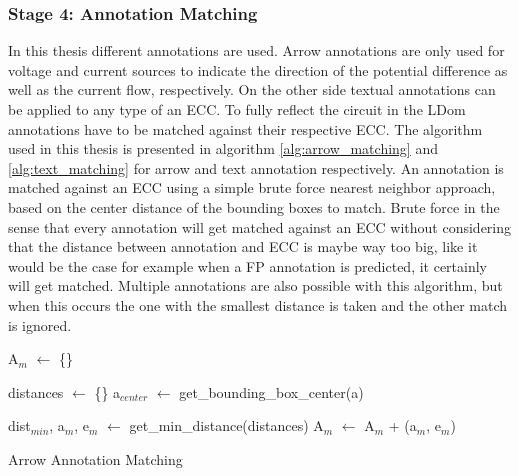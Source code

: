 \subsubsection{Stage 4: Annotation Matching}

In this thesis different annotations are used.
Arrow annotations are only used for voltage and current sources to indicate the direction of the potential difference as well as the current flow, respectively.
On the other side textual annotations can be applied to any type of an \ac{ECC}.
To fully reflect the circuit in the \ac{LDom} annotations have to be matched against their respective \ac{ECC}.
The algorithm used in this thesis is presented in algorithm \ref{alg:arrow_matching} and \ref{alg:text_matching} for arrow and text annotation respectively.
An annotation is matched against an \ac{ECC} using a simple brute force nearest neighbor approach, based on the center distance of the bounding boxes to match.
Brute force in the sense that every annotation will get matched against an \ac{ECC} without considering that the distance between annotation and \ac{ECC} is maybe way too big, like it would be the case for example when a \ac{FP} annotation is predicted, it certainly will get matched.
Multiple annotations are also possible with this algorithm, but when this occurs the one with the smallest distance is taken and the other match is ignored.

\begin{algorithm}[H]

\SetAlgoLined
{}

A$_m$ $\gets$ \{\}\;
 {
    distances $\gets$ \{\}\;
    a$_{center}$ $\gets$ get\_bounding\_box\_center(a)\;


    dist$_{min}$, a$_m$, e$_m$ $\gets$ get\_min\_distance(distances)\;
    A$_m$ $\gets$ A$_m$ + (a$_m$, e$_m$)\;
}

\caption{Arrow Annotation Matching}\label{alg:arrow_matching}
\end{algorithm}

